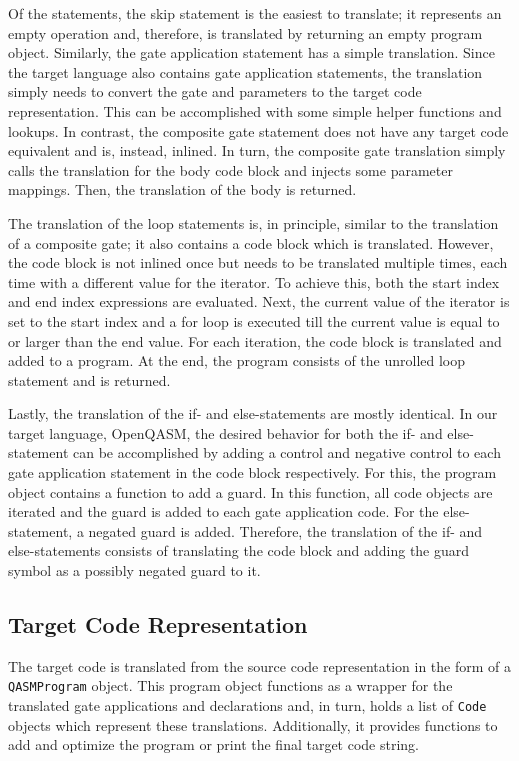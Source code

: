 Of the statements, the skip statement is the easiest to translate; it represents an empty operation and, therefore, is translated by returning an empty program object. Similarly, the gate application statement has a simple translation. Since the target language also contains gate application statements, the translation simply needs to convert the gate and parameters to the target code representation. This can be accomplished with some simple helper functions and lookups. In contrast, the composite gate statement does not have any target code equivalent and is, instead, inlined. In turn, the composite gate translation simply calls the translation for the body code block and injects some parameter mappings. Then, the translation of the body is returned.

The translation of the loop statements is, in principle, similar to the translation of a composite gate; it also contains a code block which is translated. However, the code block is not inlined once but needs to be translated multiple times, each time with a different value for the iterator. To achieve this, both the start index and end index expressions are evaluated. Next, the current value of the iterator is set to the start index and a for loop is executed till the current value is equal to or larger than the end value. For each iteration, the code block is translated and added to a program. At the end, the program consists of the unrolled loop statement and is returned. 

Lastly, the translation of the if- and else-statements are mostly identical. In our target language, OpenQASM, the desired behavior for both the if- and else-statement can be accomplished by adding a control and negative control to each gate application statement in the code block respectively. For this, the program object contains a function to add a guard. In this function, all code objects are iterated and the guard is added to each gate application code. For the else-statement, a negated guard is added. Therefore, the translation of the if- and else-statements consists of translating the code block and adding the guard symbol as a possibly negated guard to it. 

\subsection{Target Code Representation}
\label{sec:implementation_targetCode}
The target code is translated from the source code representation in the form of a \texttt{QASMProgram} object. This program object functions as a wrapper for the translated gate applications and declarations and, in turn, holds a list of \texttt{Code} objects which represent these translations. Additionally, it provides functions to add and optimize the program or print the final target code string. 


